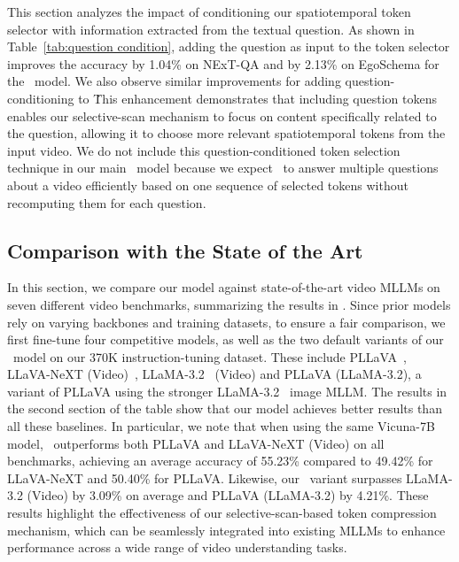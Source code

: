 This section analyzes the impact of conditioning our spatiotemporal token selector with information extracted from the textual question. As shown in Table~\ref{tab:question condition}, adding the question as input to the token selector improves the accuracy by 1.04\% on NExT-QA and by 2.13\% on EgoSchema for the \modelLlama\ model. We also observe similar improvements for adding question-conditioning to \modelLlava\. This enhancement demonstrates that including question tokens enables our selective-scan mechanism to focus on content specifically related to the question, allowing it to choose more relevant spatiotemporal tokens from the input video. We do not include this question-conditioned token selection technique in our main \model\ model because we expect \model\ to answer multiple questions about a video efficiently based on one sequence of selected tokens without recomputing them for each question.

\subsection{Comparison with the State of the Art}
\label{sec:prior methods}


In this section, we compare our model against state-of-the-art video MLLMs on seven different video benchmarks, summarizing the results in . Since prior models rely on varying backbones and training datasets, to ensure a fair comparison, we first fine-tune four competitive models, as well as the two default variants of our \model~model on our 370K instruction-tuning dataset. These include PLLaVA~\cite{xu2024pllavaparameterfreellava}, LLaVA-NeXT (Video)~\cite{liu2024llavanext}, LLaMA-3.2~\cite{llama3.2} (Video) and PLLaVA (LLaMA-3.2), a variant of PLLaVA using the stronger LLaMA-3.2~\cite{llama3.2} image MLLM. The results in the second section of the table show that our model achieves better results than all these baselines. In particular, we note that when using the same Vicuna-7B~\cite{vicuna2023} model, \modelLlava\ outperforms both PLLaVA and LLaVA-NeXT (Video) on all benchmarks, achieving an average accuracy of 55.23\% compared to 49.42\% for LLaVA-NeXT and 50.40\% for PLLaVA. Likewise, our \modelLlama\ variant surpasses LLaMA-3.2 (Video) by 3.09\% on average and PLLaVA (LLaMA-3.2) by 4.21\%. These results highlight the effectiveness of our selective-scan-based token compression mechanism, which can be seamlessly integrated into existing MLLMs to enhance performance across a wide range of video understanding tasks.



